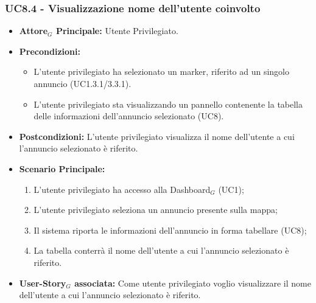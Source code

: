 \documentclass[11pt]{article}
\begin{document}
\begin{justify}
 \subsubsection{\textbf{UC8.4 - Visualizzazione nome dell'utente coinvolto}}
 \begin{itemize}
     \item \textbf{Attore$_G$ Principale:} Utente Privilegiato.
     \item \textbf{Precondizioni:}
       \begin{itemize}
    	        \item L'utente privilegiato ha selezionato un marker, riferito ad un singolo annuncio (UC1.3.1/3.3.1).
          \item L'utente privilegiato sta visualizzando un pannello contenente la tabella delle informazioni dell'annuncio selezionato (UC8).
       \end{itemize}
     \item \textbf{Postcondizioni:} L'utente privilegiato visualizza il nome dell'utente a cui l'annuncio selezionato è riferito.
     \item \textbf{Scenario Principale:}
        \begin{enumerate}
            \item L'utente privilegiato ha accesso alla Dashboard$_G$ (UC1);
            \item L'utente privilegiato seleziona un annuncio presente sulla mappa;
            \item Il sistema riporta le informazioni dell'annuncio in forma tabellare (UC8);
            \item La tabella conterrà il nome dell'utente a cui l'annuncio selezionato è riferito.
        \end{enumerate}
     \item \textbf{User-Story$_G$ associata:} Come utente privilegiato voglio visualizzare il nome dell'utente a cui l'annuncio selezionato è riferito. 
 \end{itemize}

\end{justify}
\end{document}
